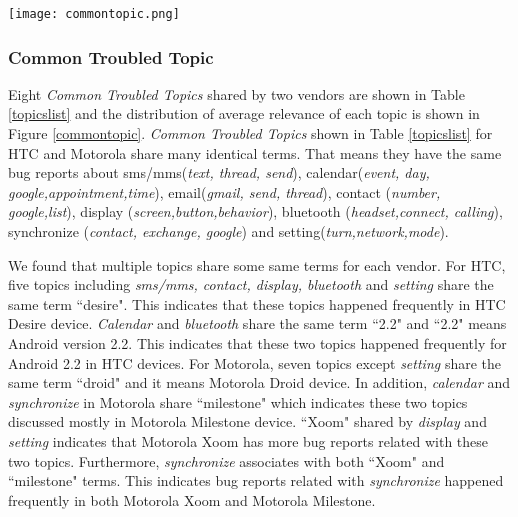 \documentclass[10pt, conference, compsocconf]{IEEEtran}
\begin{document}
\begin{figure*}[htb]
\centering
\texttt{[image: commontopic.png]}
\caption{Common Troubled Topics in HTC and Motorola}
\label{commontopic}
\end{figure*}

\subsubsection{Common Troubled Topic} 
Eight \textit{Common Troubled Topics} shared by two vendors are shown in Table \ref{topicslist} and the distribution of average relevance of each topic is shown in Figure \ref{commontopic}. 
\textit{Common Troubled Topics} shown in Table \ref{topicslist} for HTC and Motorola share many identical terms. That means they have the same bug reports about sms\//mms(\textit{text, thread, send}), calendar(\textit{event, day, google,appointment,time}), email(\textit{gmail, send, thread}), contact (\textit{number, google,list}), display (\textit{screen,button,behavior}), bluetooth (\textit{headset,connect, calling}), synchronize (\textit{contact, exchange, google}) and setting(\textit{turn,network,mode}). 

We found that multiple topics share some same terms for each vendor. For HTC, five topics including \textit{sms\//mms, contact, display, bluetooth} and \textit{setting} share the same term ``desire". This indicates that these topics happened frequently in HTC Desire device. \textit{Calendar} and \textit{bluetooth} share the same term ``2.2" and ``2.2" means Android version 2.2. This indicates that these two topics happened frequently for Android 2.2 in HTC devices. For Motorola, seven topics except \textit{setting} share the same term ``droid" and it means Motorola Droid device. In addition, \textit{calendar} and \textit{synchronize} in Motorola share ``milestone" which indicates these two topics discussed mostly in Motorola Milestone device. ``Xoom" shared by \textit{display} and \textit{setting} indicates that Motorola Xoom has more bug reports related with these two topics. Furthermore, \textit{synchronize} associates with both ``Xoom" and ``milestone" terms. This indicates bug reports related with \textit{synchronize} happened frequently in both Motorola Xoom and Motorola Milestone. 
\end{document}
